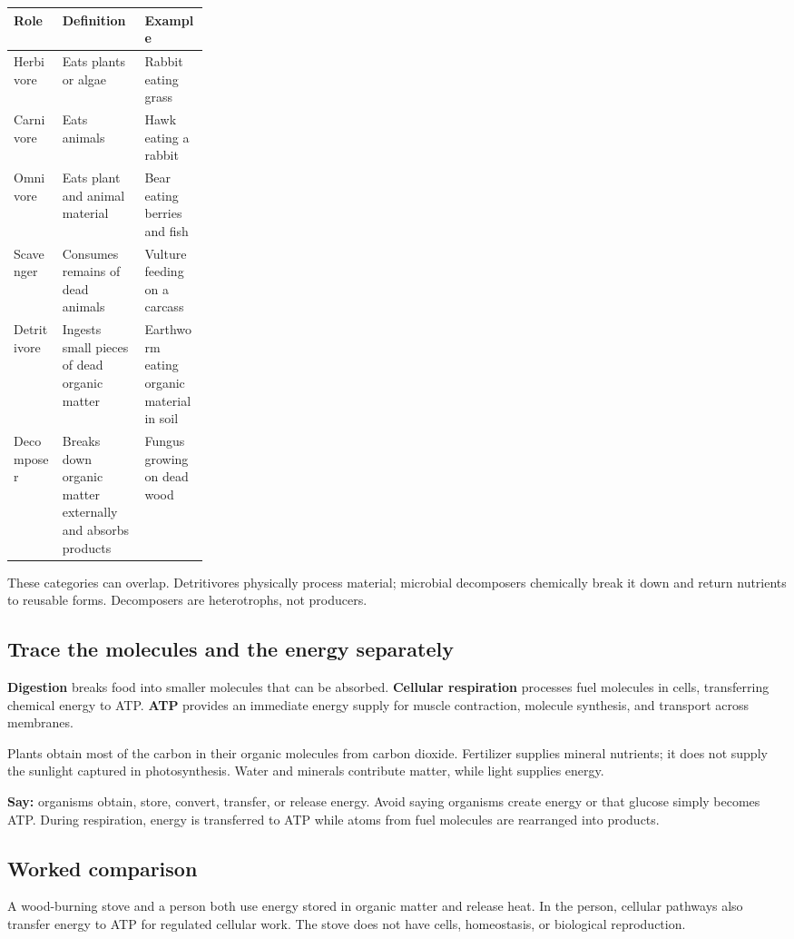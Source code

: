 \par
\begin{tabularx}{\linewidth}{@{}p{0.25\linewidth}Y Y@{}}\toprule
Role & Definition & Example\\\midrule
Herbivore & Eats plants or algae & Rabbit eating grass\\
Carnivore & Eats animals & Hawk eating a rabbit\\
Omnivore & Eats plant and animal material & Bear eating berries and fish\\
Scavenger & Consumes remains of dead animals & Vulture feeding on a carcass\\
Detritivore & Ingests small pieces of dead organic matter & Earthworm eating organic material in soil\\
Decomposer & Breaks down organic matter externally and absorbs products & Fungus growing on dead wood\\\bottomrule
\end{tabularx}\par
These categories can overlap. Detritivores physically process material; microbial decomposers chemically break it down and return nutrients to reusable forms. Decomposers are heterotrophs, not producers.
\subsection*{Trace the molecules and the energy separately}
\textbf{Digestion} breaks food into smaller molecules that can be absorbed. \textbf{Cellular respiration} processes fuel molecules in cells, transferring chemical energy to ATP. \textbf{ATP} provides an immediate energy supply for muscle contraction, molecule synthesis, and transport across membranes.

Plants obtain most of the carbon in their organic molecules from carbon dioxide. Fertilizer supplies mineral nutrients; it does not supply the sunlight captured in photosynthesis. Water and minerals contribute matter, while light supplies energy.

\textbf{Say:} organisms obtain, store, convert, transfer, or release energy. Avoid saying organisms create energy or that glucose simply becomes ATP. During respiration, energy is transferred to ATP while atoms from fuel molecules are rearranged into products.
\subsection*{Worked comparison}
A wood-burning stove and a person both use energy stored in organic matter and release heat. In the person, cellular pathways also transfer energy to ATP for regulated cellular work. The stove does not have cells, homeostasis, or biological reproduction.

